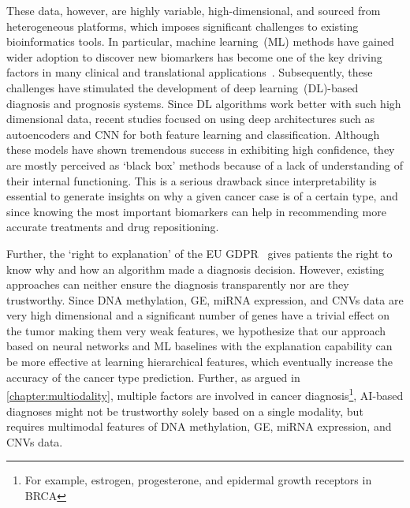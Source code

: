 \hspace*{3.5mm} These data, however, are highly variable, high-dimensional, and sourced from heterogeneous platforms, which imposes significant challenges to existing bioinformatics tools. In particular, machine learning~(ML) methods have gained wider adoption to discover new biomarkers has become one of the key driving factors in many clinical and translational applications~\cite{mostavi2019convolutional}. Subsequently, these challenges have stimulated the development of deep learning~(DL)-based diagnosis and prognosis systems. Since DL algorithms work better with such high dimensional data, recent studies focused on using deep architectures such as autoencoders and CNN for both feature learning and classification. Although these models have shown tremendous success in exhibiting high confidence, they are mostly perceived as `black box' methods because of a lack of understanding of their internal functioning. This is a serious drawback since interpretability is essential to generate insights on why a given cancer case is of a certain type, and since knowing the most important biomarkers can help in recommending more accurate treatments and drug repositioning. 

\hspace*{3.5mm} Further, the `right to explanation' of the EU GDPR~\cite{kaminski2019right} gives patients the right to know why and how an algorithm made a diagnosis decision. However, existing approaches can neither ensure the diagnosis transparently nor are they trustworthy. Since DNA methylation, GE, miRNA expression, and CNVs data are very high dimensional and a significant number of genes have a trivial effect on the tumor making them very weak features, we hypothesize that our approach  based on neural networks and ML baselines with the explanation capability can be more effective at learning hierarchical features, which eventually increase the accuracy of the cancer type prediction. Further, as argued in \cref{chapter:multiodality}, multiple factors are involved in cancer diagnosis\footnote{For example, estrogen, progesterone, and epidermal growth receptors in BRCA}, AI-based diagnoses might not be trustworthy solely based on a single modality, but requires multimodal features of DNA methylation, GE, miRNA expression, and CNVs data. 


